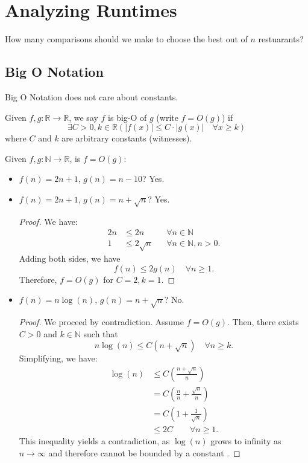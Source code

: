 
\section{Analyzing Runtimes}

How many comparisons should we make to choose the best out of \( n \) restuarants?

\subsection{Big O Notation}
Big O Notation does not care about constants.

\begin{definition}
	Given \( f,g \colon \mathbb{R} \to \mathbb{R} \), we say \( f \) is big-O of \( g \) (write \( f=O(g) \)) if \[ \exists C>0, k \in \mathbb{R}(|f(x)| \le  C \cdot |g(x)| \quad \forall  x \ge  k) \] where \( C \) and \( k \) are arbitrary constants (witnesses).
\end{definition}

\begin{eg}
	Given \( f,g \colon \mathbb{N} \to \mathbb{R} \), is \( f=O(g) \):
	\begin{itemize}
		\item \( f(n) = 2n+1 \), \( g(n) = n - 10 \)? Yes.
		\item \( f(n) = 2n+1 \), \( g(n) = n + \sqrt{n}  \)? Yes.
			\begin{proof}
				We have:
				\begin{align*}
					2n & \le 2n && \forall  n \in \mathbb{N} \\
					1 & \le 2\sqrt{n} && \forall n \in  \mathbb{N}, n > 0
				.\end{align*}
				Adding both sides, we have \[
					f(n) \le  2g(n) \quad \forall n\ge 1
				.\] Therefore, \( f = O(g) \) for \( C = 2, k = 1 \).
			\end{proof}
		\item \( f(n) = n\log (n) \), \( g(n) = n + \sqrt{n}  \)? No.
			\begin{proof}
				We proceed by contradiction. Assume \( f = O(g) \). Then, there exists \( C>0 \) and \( k \in \mathbb{N} \) such that \[
					n\log (n) \le  C(n + \sqrt{n} ) \quad \forall n \ge k
				.\] Simplifying, we have: 
				\begin{align*}
					\log (n) & \le  C \left(\frac{n+ \sqrt{n}}{n}\right) \\
										& = C\left(\frac{n}{n} + \frac{\sqrt{n}}{n}\right) \\
										& = C\left(1 + \frac{1}{\sqrt{n} }\right) \\
										& \le 2C \qquad \forall n \ge  1
				.\end{align*}
				This inequality yields a contradiction, as \( \log (n) \) grows to infinity as \( n \to \infty \) and therefore cannot be bounded by a constant \contra.
			\end{proof}
	\end{itemize}
\end{eg}


